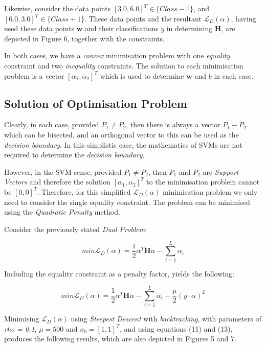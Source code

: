 \documentclass[10pt, a4paper,reqno]{amsart}
\begin{document}
Likewise, consider the data points $[3.0, 6.0]^T \in \{Class -1\}$, and $[6.0, 3.0]^T \in \{Class +1\}$. These data points and the resultant $\mathcal{L}_D(\alpha)$, having used these data points $\mathbf{w}$ and their classifications $y$ in determining $\mathbf{H}$, are depicted in Figure 6, together with the constraints.

In both cases, we have a \emph{convex} minimisation problem with one \emph{equality} constraint and two \emph{inequality} constraints. The solution to each minimisation problem is a vector $[\alpha_1, \alpha_2]^T$ which is used to determine $\mathbf{w}$ and $b$ in each case.


\subsection{Solution of Optimisation Problem}

Clearly, in each case, provided $P_1 \neq P_2$, then there is always a vector $P_1 - P_2$ which can be bisected, and an orthogonal vector to this can be used as the \emph{decision boundary}. In this simplistic case, the mathematics of SVMs are not required to determine the \emph{decision boundary}. 

However, in the SVM sense, provided $P_1 \neq P_2$, then $P_1$ and $P_2$ are \emph{Support Vectors} and therefore the solution $[\alpha_1, \alpha_2]^T$ to the minimisation problem cannot be $[0, 0]^T$. Therefore, for this simplified $\mathcal{L}_D(\alpha)$ minimisation problem we only need to consider the single equality constraint. The problem can be minimised using the \emph{Quadratic Penalty} method.

Consider the previously stated \emph{Dual Problem}:

\begin{equation}
min\mathcal{L}_D(\alpha) = \frac{1}{2}\alpha^T\mathbf{H}\alpha - \sum_{i=1}^{L}\alpha_i
\end{equation}

Including the equality constraint as a penalty factor, yields the following:

\begin{equation}
min\mathcal{L}_D(\alpha) = \frac{1}{2}\alpha^T\mathbf{H}\alpha - \sum_{i=1}^{L}\alpha_i - \frac{\mu}{2}(y\cdot\alpha)^2
\end{equation}

Minimising $\mathcal{L}_D(\alpha)$ using \emph{Steepest Descent} with \emph{backtracking}, with parameters of \emph{rho = 0.1}, $\mu = 500$ and $x_0 = [1, 1]^T$, and using equations (11) and (13), produces the following results, which are also depicted in Figures 5 and 7.
\end{document}
